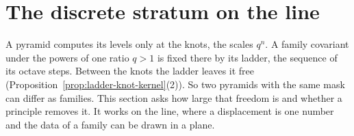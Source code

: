 \section{The discrete stratum on the line}
\label{ch:line-appendix}

A pyramid computes its levels only at the knots, the scales $q^n$. A family covariant under the
powers of one ratio $q > 1$ is fixed there by its ladder, the sequence of its octave steps. Between
the knots the ladder leaves it free (Proposition~\ref{prop:ladder-knot-kernel}(2)). So two pyramids
with the same mask can differ as families. This section asks how large that freedom is and whether
a principle removes it. It works on the line, where a displacement is one number and the \Levy{}
data of a family can be drawn in a plane.

